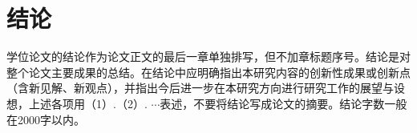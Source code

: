 ﻿%

\chapter*{结\quad 论}

学位论文的结论作为论文正文的最后一章单独排写，但不加章标题序号。结论是对整个论文主要成果的总结。在结论中应明确指出本研究内容的创新性成果或创新点（含新见解、新观点），并指出今后进一步在本研究方向进行研究工作的展望与设想，上述各项用（1）.（2）.  $\cdots$表述，不要将结论写成论文的摘要。结论字数一般在2000字以内。